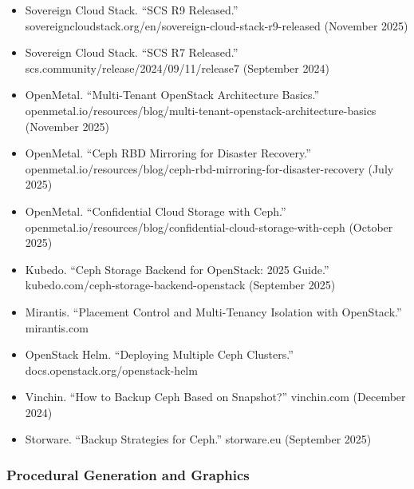 \documentclass[11pt,letterpaper]{article}
\begin{document}
\begin{itemize}[leftmargin=2em]
  \item Sovereign Cloud Stack. ``SCS R9 Released.'' sovereigncloudstack.org/en/sovereign-cloud-stack-r9-released (November 2025)
  \item Sovereign Cloud Stack. ``SCS R7 Released.'' scs.community/release/2024/09/11/release7 (September 2024)
  \item OpenMetal. ``Multi-Tenant OpenStack Architecture Basics.'' openmetal.io/resources/blog/multi-tenant-openstack-architecture-basics (November 2025)
  \item OpenMetal. ``Ceph RBD Mirroring for Disaster Recovery.'' openmetal.io/resources/blog/ceph-rbd-mirroring-for-disaster-recovery (July 2025)
  \item OpenMetal. ``Confidential Cloud Storage with Ceph.'' openmetal.io/resources/blog/confidential-cloud-storage-with-ceph (October 2025)
  \item Kubedo. ``Ceph Storage Backend for OpenStack: 2025 Guide.'' kubedo.com/ceph-storage-backend-openstack (September 2025)
  \item Mirantis. ``Placement Control and Multi-Tenancy Isolation with OpenStack.'' mirantis.com
  \item OpenStack Helm. ``Deploying Multiple Ceph Clusters.'' docs.openstack.org/openstack-helm
  \item Vinchin. ``How to Backup Ceph Based on Snapshot?'' vinchin.com (December 2024)
  \item Storware. ``Backup Strategies for Ceph.'' storware.eu (September 2025)
\end{itemize}

\subsubsection{Procedural Generation and Graphics}
\end{document}
